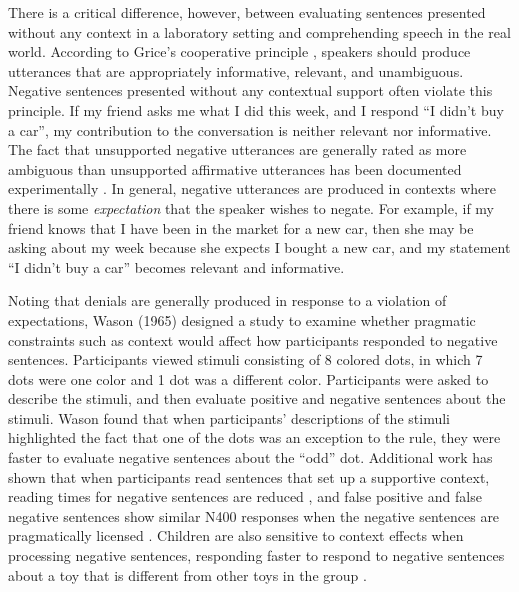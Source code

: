 \documentclass[10pt,letterpaper]{article}
\begin{document}
There is a critical difference, however, between evaluating sentences presented without any context in a laboratory setting and comprehending speech in the real world. According to Grice's cooperative principle \cite{grice1975}, speakers should produce utterances that are appropriately informative, relevant, and unambiguous.  Negative sentences presented without any contextual support often violate this principle.  If my friend asks me what I did this week, and I respond ``I didn't buy a car'', my contribution to the conversation is neither relevant nor informative.  The fact that unsupported negative utterances are generally rated as more ambiguous than unsupported affirmative utterances has been documented experimentally \cite{glenberg1999}.  In general, negative utterances are produced in contexts where there is some \emph{expectation} that the speaker wishes to negate.  For example, if my friend knows that I have been in the market for a new car, then she may be asking about my week because she expects I bought a new car, and my statement ``I didn't buy a car'' becomes relevant and informative.  

Noting that denials are generally produced in response to a violation of expectations, Wason (1965) designed a study to examine whether pragmatic constraints such as context would affect how participants responded to negative sentences.  Participants viewed stimuli consisting of 8 colored dots, in which 7 dots were one color and 1 dot was a different color.  Participants were asked to describe the stimuli, and then evaluate positive and negative sentences about the stimuli.  Wason found that when participants' descriptions of the stimuli highlighted the fact that one of the dots was an exception to the rule, they were faster to evaluate negative sentences about the ``odd'' dot.  Additional work has shown that when participants read sentences that set up a supportive context, reading times for negative sentences are reduced \cite{glenberg1999}, and false positive and false negative sentences show similar N400 responses when the negative sentences are pragmatically licensed \cite{nieuwland2008}.  Children are also sensitive to context effects when processing negative sentences, responding faster to respond to negative sentences about a toy that is different from other toys in the group \cite{devilliers1975}.
\end{document}
